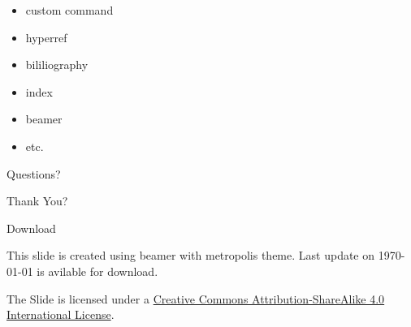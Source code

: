 \documentclass[10pt]{beamer}
\newcommand{\themename}{\textbf{\textsc{metropolis}}\xspace}
\begin{document}
\begin{frame}
\begin{itemize}
	\item custom command
	\item hyperref
	\item bililiography
	\item index
	\item beamer
	\item etc.
\end{itemize}
\end{frame}

{
\begin{frame}[standout]
  Questions?
\end{frame}
}

{
\begin{frame}[standout]
  Thank You?
\end{frame}
}

\appendix

\begin{frame}{Download}

  This slide is created using beamer with metropolis theme. Last update on {\today } is avilable for download.

 \begin{center} 
 \href{https://goo.gl/jDsT79}{}
 \end{center}

  The Slide is licensed under a
  \href{http://creativecommons.org/licenses/by-sa/4.0/}{Creative Commons
  Attribution-ShareAlike 4.0 International License}.

  \begin{center}\ccbysa\end{center}

\end{frame}






%   
%   
  
  

\end{document}
